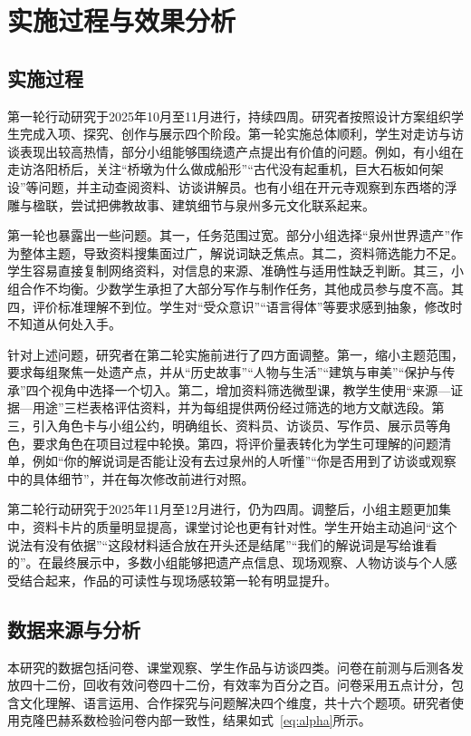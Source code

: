 \chapter{实施过程与效果分析}

\section{实施过程}

第一轮行动研究于2025年10月至11月进行，持续四周。研究者按照设计方案组织学生完成入项、探究、创作与展示四个阶段。第一轮实施总体顺利，学生对走访与访谈表现出较高热情，部分小组能够围绕遗产点提出有价值的问题。例如，有小组在走访洛阳桥后，关注“桥墩为什么做成船形”“古代没有起重机，巨大石板如何架设”等问题，并主动查阅资料、访谈讲解员。也有小组在开元寺观察到东西塔的浮雕与楹联，尝试把佛教故事、建筑细节与泉州多元文化联系起来。

第一轮也暴露出一些问题。其一，任务范围过宽。部分小组选择“泉州世界遗产”作为整体主题，导致资料搜集面过广，解说词缺乏焦点。其二，资料筛选能力不足。学生容易直接复制网络资料，对信息的来源、准确性与适用性缺乏判断。其三，小组合作不均衡。少数学生承担了大部分写作与制作任务，其他成员参与度不高。其四，评价标准理解不到位。学生对“受众意识”“语言得体”等要求感到抽象，修改时不知道从何处入手。

针对上述问题，研究者在第二轮实施前进行了四方面调整。第一，缩小主题范围，要求每组聚焦一处遗产点，并从“历史故事”“人物与生活”“建筑与审美”“保护与传承”四个视角中选择一个切入。第二，增加资料筛选微型课，教学生使用“来源—证据—用途”三栏表格评估资料，并为每组提供两份经过筛选的地方文献选段。第三，引入角色卡与小组公约，明确组长、资料员、访谈员、写作员、展示员等角色，要求角色在项目过程中轮换。第四，将评价量表转化为学生可理解的问题清单，例如“你的解说词是否能让没有去过泉州的人听懂”“你是否用到了访谈或观察中的具体细节”，并在每次修改前进行对照。

第二轮行动研究于2025年11月至12月进行，仍为四周。调整后，小组主题更加集中，资料卡片的质量明显提高，课堂讨论也更有针对性。学生开始主动追问“这个说法有没有依据”“这段材料适合放在开头还是结尾”“我们的解说词是写给谁看的”。在最终展示中，多数小组能够把遗产点信息、现场观察、人物访谈与个人感受结合起来，作品的可读性与现场感较第一轮有明显提升。

\section{数据来源与分析}

本研究的数据包括问卷、课堂观察、学生作品与访谈四类。问卷在前测与后测各发放四十二份，回收有效问卷四十二份，有效率为百分之百。问卷采用五点计分，包含文化理解、语言运用、合作探究与问题解决四个维度，共十六个题项。研究者使用克隆巴赫系数检验问卷内部一致性，结果如式~\eqref{eq:alpha}所示。

